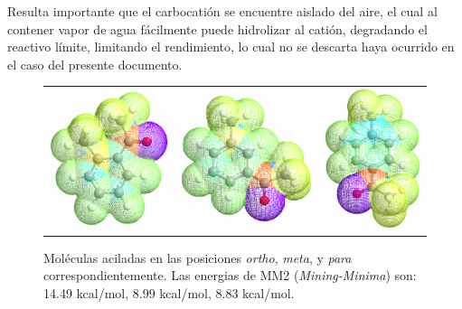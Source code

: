 \documentclass[fleqn,11pt]{SelfArx}
\begin{document}
Resulta importante que el carbocatión se encuentre aislado del aire, el cual al contener vapor de agua fácilmente puede hidrolizar al catión, degradando el reactivo límite, limitando el rendimiento, lo cual no se descarta haya ocurrido en el caso del presente documento.
\newpage

\begin{figure}[ht]
	\centering
	\begin{tabular}{ccc}
		\includegraphics[width=0.3\linewidth]{structures/ortho.png} & 
		\includegraphics[width=0.3\linewidth]{structures/meta.png} &
		\includegraphics[width=0.25\linewidth]{structures/para.png}
	\end{tabular}
	
	\caption{Moléculas aciladas en las posiciones \textit{ortho}, \textit{meta}, y \textit{para} correspondientemente. Las energias de MM2 (\textit{Mining-Minima}) son: 14.49 kcal/mol, 8.99 kcal/mol, 8.83 kcal/mol.}
	\label{fig: energy}
\end{figure}
\end{document}
